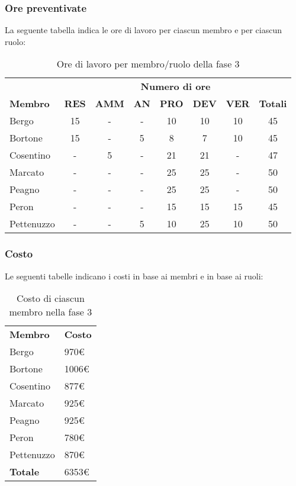 	\subsubsection{Ore preventivate}
		La seguente tabella indica le ore di lavoro per ciascun membro e per ciascun ruolo:
		\begin{table}[h]
			\centering
			\begin{tabular}{| l | c c c c c c | c |}
				\rowcolor{LightBlue}
				& \multicolumn{7}{c}{\textbf{\color{white}Numero di ore}}	\\
	
				\rowcolor{LightBlue}
				\textbf{\color{white}Membro}
				& \textbf{\color{white}RES}
				& \textbf{\color{white}AMM}
				& \textbf{\color{white}AN}
				& \textbf{\color{white}PRO}
				& \textbf{\color{white}DEV}
				& \textbf{\color{white}VER}
				& \textbf{\color{white}Totali}\\
	
				Bergo      & 15 & - & - & 10 & 10 & 10 & 45 \\
				Bortone    & 15 & - & 5 & 8 & 7 & 10 & 45  \\
				Cosentino  & - & 5 & - & 21 & 21 & - & 47 \\
				Marcato    & - & - & - & 25 & 25 & - & 50 \\
				Peagno     & - & - & - & 25 & 25 & - & 50 \\
				Peron      & - & - & - & 15 & 15 & 15 & 45 \\
				Pettenuzzo & - & - & 5 & 10 & 25 & 10 & 50 \\ \hline
			\end{tabular}
			\caption{Ore di lavoro per membro/ruolo della fase 3}
		\end{table}
		
	\subsubsection{Costo}
		Le seguenti tabelle indicano i costi in base ai membri e in base ai ruoli:
		\begin{table}[h]
			\centering
			\begin{tabular}{| l | l |}
				\rowcolor{LightBlue}
				\textbf{\color{white}Membro}
				& \textbf{\color{white}Costo}\\
				
				Bergo 				& 970€\\
				Bortone 			& 1006€\\
				Cosentino 		& 877€\\
				Marcato 			& 925€\\
				Peagno 			& 925€\\
				Peron 				& 780€\\
				Pettenuzzo 	& 870€\\ \hline
				\textbf{Totale} & 6353€\\ \hline
			\end{tabular}
			\caption{Costo di ciascun membro nella fase 3}
		\end{table}
		
